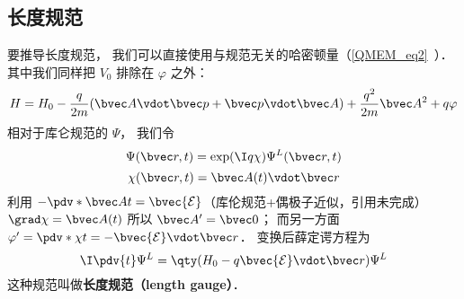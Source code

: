 \subsection{长度规范}
要推导长度规范， 我们可以直接使用与规范无关的哈密顿量（\autoref{QMEM_eq2}~）． 其中我们同样把 $V_0$ 排除在 $\varphi$ 之外：
\begin{equation}
H = H_0 - \frac{q}{2m} (\bvec A \vdot \bvec p + \bvec p \vdot \bvec A)
+ \frac{q^2}{2m} \bvec A^2 + q \varphi
\end{equation}
相对于库仑规范的 $\Psi$， 我们令
\begin{equation}
\Psi(\bvec r, t) = \exp(\I q\chi)\Psi^L(\bvec r, t)
\end{equation}
\begin{equation}
\chi(\bvec r, t) = \bvec A(t) \vdot \bvec r
\end{equation}
利用 $-\pdv*{\bvec A}{t} = \bvec {\mathcal E}$（库伦规范+偶极子近似，引用未完成） $\grad \chi = \bvec A(t)$ 所以 $\bvec A' = \bvec 0$； 而另一方面 $\varphi' = \pdv*{\chi}{t} = -\bvec {\mathcal E} \vdot \bvec r$． 变换后薛定谔方程为
\begin{equation}
\I \pdv{t} \Psi^L = \qty(H_0 - q\bvec{\mathcal{E}} \vdot \bvec r) \Psi^L
\end{equation}
这种规范叫做\textbf{长度规范（length gauge）}．
